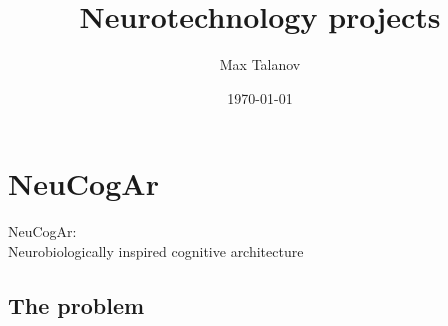 \documentclass[12pt, aspectratio=169]{beamer}
\title[Neurotechnology]{Neurotechnology projects} %
\author[Max Talanov]{
  Max Talanov
}
\institute[ITIS: KFU]%
{
Neuro-biology lab /ITIS, KFU \\ %
\medskip
\textit{max.talanov@gmail.com} %
}
\date{\today} %
\begin{document}
\begin{frame}
\titlepage %
\end{frame}


\section{NeuCogAr}

\begin{frame}
  NeuCogAr:\\
  Neurobiologically inspired cognitive architecture
\end{frame}


\subsection{The problem} %
\end{document}
